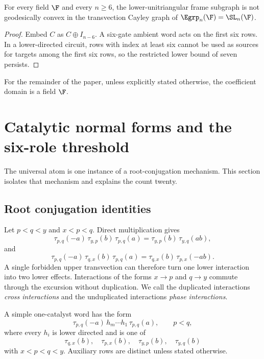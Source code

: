 \begin{corollary}\label{cor:nonconvex}
For every field $\F$ and every $n\ge6$, the lower-unitriangular frame subgraph is not geodesically convex in the transvection Cayley graph of $\Egrp_n(\F)=\SL_n(\F)$.
\end{corollary}

\begin{proof}
Embed $C$ as $C\oplus I_{n-6}$.  A six-gate ambient word acts on the first six rows.  In a lower-directed circuit, rows with index at least six cannot be used as sources for targets among the first six rows, so the restricted lower bound of seven persists.
\end{proof}

For the remainder of the paper, unless explicitly stated otherwise, the coefficient domain is a field $\F$.

\section{Catalytic normal forms and the six-role threshold}\label{sec:catalysis}

The universal atom is one instance of a root-conjugation mechanism.  This section isolates that mechanism and explains the count twenty.

\subsection{Root conjugation identities}

Let $p<q<y$ and $x<p<q$.  Direct multiplication gives
\begin{equation}\label{eq:read-conjugation}
\tau_{p,q}(-a)\,\tau_{y,p}(b)\,\tau_{p,q}(a)
=
\tau_{y,p}(b)\,\tau_{y,q}(ab),
\end{equation}
and
\begin{equation}\label{eq:update-conjugation}
\tau_{p,q}(-a)\,\tau_{q,x}(b)\,\tau_{p,q}(a)
=
\tau_{q,x}(b)\,\tau_{p,x}(-ab).
\end{equation}
A single forbidden upper transvection can therefore turn one lower interaction into two lower effects.  Interactions of the forms $x\to p$ and $q\to y$ commute through the excursion without duplication.  We call the duplicated interactions \emph{cross interactions} and the unduplicated interactions \emph{phase interactions}.

\begin{definition}\label{def:simple-catalyst}
A simple one-catalyst word has the form
\[
\tau_{p,q}(-a)\,h_m\cdots h_1\,\tau_{p,q}(a),
\qquad p<q,
\]
where every $h_i$ is lower directed and is one of
\[
\tau_{q,x}(b),\quad \tau_{p,x}(b),\quad
\tau_{y,p}(b),\quad \tau_{y,q}(b)
\]
with $x<p<q<y$.  Auxiliary rows are distinct unless stated otherwise.
\end{definition}

